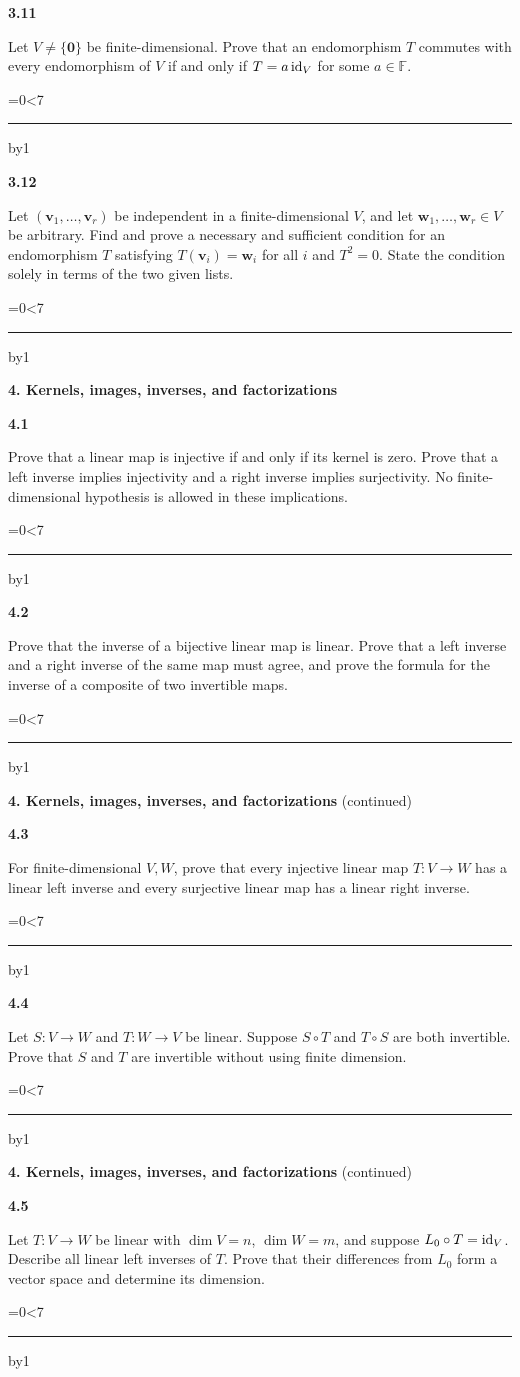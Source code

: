 \documentclass[11pt,letterpaper]{article}
\newcommand{\topicshort}{Problem collection}
\newcommand{\F}{\mathbb F}\newcommand{\R}{\mathbb R}\newcommand{\Q}{\mathbb Q}\newcommand{\C}{\mathbb C}\newcommand{\Z}{\mathbb Z}
\newcommand{\ruled}[1]{\par\begingroup\parskip=0pt\baselineskip=17pt\count255=0\loop\ifnum\count255<#1\noindent\textcolor{black!17}{\rule{\linewidth}{.25pt}}\par\advance\count255 by1\repeat\endgroup}
\newcommand{\problem}[4]{\noindent\begin{minipage}[t][3.48in][t]{\linewidth}\textbf{\color{navy}#1}\quad{\small\sffamily\color{teal}#2#3}\par #4\par\vfill\ruled{7}\end{minipage}}
\begin{document}
\problem{3.11}{C}{}{Let $V\ne\{\mathbf0\}$ be finite-dimensional. Prove that an endomorphism $T$ commutes with every endomorphism of $V$ if and only if $T=a\operatorname{id}_V$ for some $a\in\F$.}
\par\vspace{14pt}
\problem{3.12}{C}{}{Let $(\mathbf v_1,\ldots,\mathbf v_r)$ be independent in a finite-dimensional $V$, and let $\mathbf w_1,\ldots,\mathbf w_r\in V$ be arbitrary. Find and prove a necessary and sufficient condition for an endomorphism $T$ satisfying $T(\mathbf v_i)=\mathbf w_i$ for all $i$ and $T^2=0$. State the condition solely in terms of the two given lists.}
\newpage
\renewcommand{\topicshort}{Kernels and inverses}
{\large\bfseries\color{navy}4. Kernels, images, inverses, and factorizations}\par\vspace{9pt}
\problem{4.1}{W}{ / $\star$}{Prove that a linear map is injective if and only if its kernel is zero. Prove that a left inverse implies injectivity and a right inverse implies surjectivity. No finite-dimensional hypothesis is allowed in these implications.}
\par\vspace{14pt}
\problem{4.2}{W}{ / $\star$}{Prove that the inverse of a bijective linear map is linear. Prove that a left inverse and a right inverse of the same map must agree, and prove the formula for the inverse of a composite of two invertible maps.}
\newpage
\renewcommand{\topicshort}{Kernels and inverses}
{\large\bfseries\color{navy}4. Kernels, images, inverses, and factorizations} {\small(continued)}\par\vspace{9pt}
\problem{4.3}{M}{ / $\star$}{For finite-dimensional $V,W$, prove that every injective linear map $T:V\to W$ has a linear left inverse and every surjective linear map has a linear right inverse.}
\par\vspace{14pt}
\problem{4.4}{M}{}{Let $S:V\to W$ and $T:W\to V$ be linear. Suppose $S\circ T$ and $T\circ S$ are both invertible. Prove that $S$ and $T$ are invertible without using finite dimension.}
\newpage
\renewcommand{\topicshort}{Kernels and inverses}
{\large\bfseries\color{navy}4. Kernels, images, inverses, and factorizations} {\small(continued)}\par\vspace{9pt}
\problem{4.5}{M}{}{Let $T:V\to W$ be linear with $\dim V=n$, $\dim W=m$, and suppose $L_0\circ T=\operatorname{id}_V$. Describe all linear left inverses of $T$. Prove that their differences from $L_0$ form a vector space and determine its dimension.}
\end{document}
